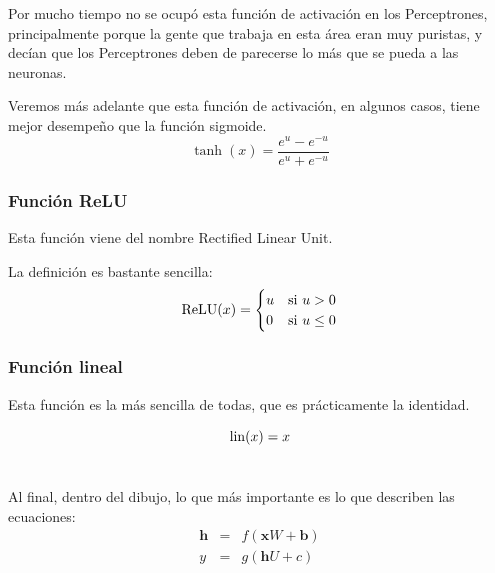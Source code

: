 Por mucho tiempo no se ocupó esta función de activación en los Perceptrones, principalmente porque la gente que trabaja en esta área eran muy puristas, y decían que los Perceptrones deben de parecerse lo más que se pueda a las neuronas.

Veremos más adelante que esta función de activación, en algunos casos, tiene mejor desempeño que la función sigmoide.
\begin{equation}
    \tanh(x) = \frac{e^u - e^{-u}}{e^u + e^{-u}}
\end{equation}


\subsubsection*{Función ReLU}

Esta función viene del nombre Rectified Linear Unit.

La definición es bastante sencilla:
\begin{equation}
    \operatorname{ReLU}(x) = 
    \begin{cases}
        u & \mbox{si } u>0\\
        0 & \mbox{si } u\leq0\\
    \end{cases}
\end{equation}


\subsubsection*{Función lineal}

Esta función es la más sencilla de todas, que es prácticamente la identidad.

\begin{equation}
    \operatorname{lin}(x) = x
\end{equation}


\section{}



Al final, dentro del dibujo, lo que más importante es lo que describen las ecuaciones:
\begin{eqnarray}
\bm{h} &=& f(\bm{x} W + \bm{b})\\
y &=& g(\bm{h} U + c)
\end{eqnarray}

